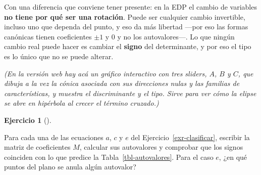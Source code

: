 \documentclass[
  spanish,
  a4paper,
]{scrbook}
\theoremstyle{definition}
\theoremstyle{plain}
\theoremstyle{definition}
\theoremstyle{plain}
\theoremstyle{definition}
\newtheorem{exercise}{Ejercicio}[chapter]
\theoremstyle{remark}
\begin{document}
\begin{tcolorbox}[enhanced jigsaw, arc=.35mm, bottomrule=.15mm, breakable, colback=white, colframe=quarto-callout-tip-color-frame, left=2mm, leftrule=.75mm, opacityback=0, rightrule=.15mm, toprule=.15mm]
\begin{minipage}[t]{\textwidth - 5.5mm}
Con una diferencia que conviene tener presente: en la EDP el cambio de
variables \textbf{no tiene por qué ser una rotación}. Puede ser
cualquier cambio invertible, incluso uno que dependa del punto, y eso da
más libertad ---por eso las formas canónicas tienen coeficientes
\(\pm 1\) y \(0\) y no los autovalores---. Lo que ningún cambio real
puede hacer es cambiar el \textbf{signo} del determinante, y por eso el
tipo es lo único que no se puede alterar.

\end{minipage}%
\end{tcolorbox}

\emph{(En la versión web hay acá un gráfico interactivo con tres
sliders, \(A\), \(B\) y \(C\), que dibuja a la vez la cónica asociada
con sus direcciones nulas y las familias de características, y muestra
el discriminante y el tipo. Sirve para ver cómo la elipse se abre en
hipérbola al crecer el término cruzado.)}

\begin{exercise}[]\protect\hypertarget{exr-autovalores}{}\label{exr-autovalores}

Para cada una de las ecuaciones \(a\), \(c\) y \(e\) del
Ejercicio~\ref{exr-clasificar}, escribir la matriz de coeficientes
\(M\), calcular sus autovalores y comprobar que los signos coinciden con
lo que predice la Tabla~\ref{tbl-autovalores}. Para el caso \(e\), ¿en
qué puntos del plano se anula algún autovalor?

\end{exercise}
\end{document}
